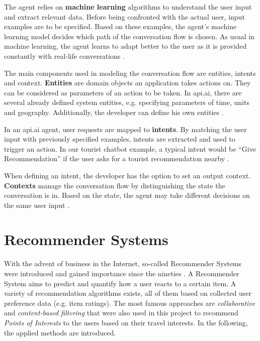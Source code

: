 The agent relies on \textbf{machine learning} algorithms to understand the user input and extract relevant data. Before being confronted with the actual user, input examples are to be specified. Based on these examples, the agent’s machine learning model decides which path of the conversation flow is chosen. As usual in machine learning, the agent learns to adapt better to the user as it is provided constantly with real-life conversations \cite{apiai:ml}. 

The main components used in modeling the conversation flow are entities, intents and context.  \textbf{Entities} are domain objects an application takes actions on. They can be considered as parameters of an action to be taken. In api.ai, there are several already defined system entities, e.g. specifying parameters of time, units and geography. Additionally, the developer can define his own entities \cite{apiai:entities}. 

In an api.ai agent, user requests are mapped to  \textbf{intents}. By matching the user input with previously specified examples, intents are extracted and used to trigger an action. In our tourist chatbot example, a typical intent would be “Give Recommendation” if the user asks for a tourist recommendation nearby \cite{apiai:intents}.
 
When defining an intent, the developer has the option to set an output context.  \textbf{Contexts} manage the conversation flow by distinguishing the state the conversation is in. Based on the state, the agent may take different decisions on the same user input \cite{apiai:contexts}. 


\section{Recommender Systems}

With the advent of business in the Internet, so-called Recommender Systems were introduced and gained importance since the nineties \cite{aggarwal16}.  A Recommender System aims to predict and quantify how a user reacts to a certain item. A variety of recommendation algorithms exists, all of them based on collected user preference data (e.g. item ratings). The most famous approaches are \textit{collaborative} and \textit{content-based filtering} that were also used in this project to recommend \textit{Points of Interests} to the users based on their travel interests. In the following, the applied methods are introduced.

